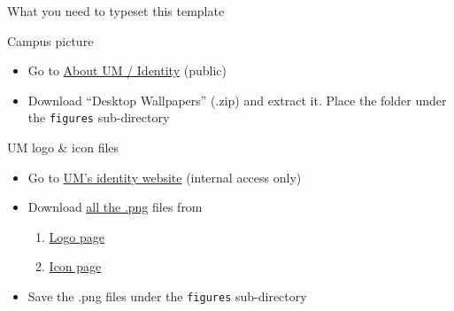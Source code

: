\documentclass[12pt]{beamer}
\begin{document}
\begin{frame}{{\color{UMYellow} What you need} to typeset this template}

\begin{exampleblock}{Campus picture}
\begin{itemize}
\item Go to \href{https://www.um.edu.mo/about-um/identity/}{\myURL About UM / Identity} (public)
\item Download ``Desktop Wallpapers'' (.zip) and extract it. Place the folder under the {\tt \footnotesize figures} sub-directory 
\end{itemize}
\end{exampleblock}

\begin{exampleblock}{UM logo \& icon files}
\begin{itemize}
\item Go to \href{https://identity.co.um.edu.mo/}{\myURL UM's identity website} (internal access only)
\item Download \underline{all the .png} files from
	\begin{enumerate}
	\item \href{https://identity.co.um.edu.mo/university-logo/}{\myURL Logo page}
	\item \href{https://identity.co.um.edu.mo/university-icon/}{\myURL Icon page}
	\end{enumerate}
\item Save the .png files under the {\tt \footnotesize figures} sub-directory 
\end{itemize}
\end{exampleblock}

\end{frame}


{
\begin{frame}

 \color{UMYellow}{\bf\Large UMLightBlue as background color}

\end{frame}
}
\end{document}
